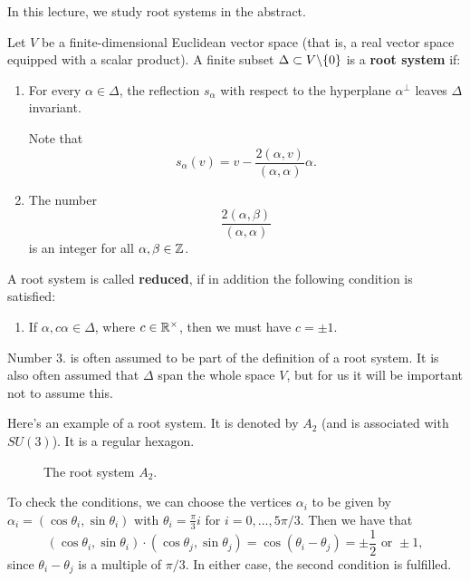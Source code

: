 \documentclass[11pt, english]{article}
\begin{document}
In this lecture, we study root systems in the abstract.

Let $V$ be a finite-dimensional Euclidean vector space (that is, a real vector space equipped with a scalar product). A finite subset $\Delta \subset V \backslash \{ 0 \}$ is a \textbf{root system} if:

\begin{enumerate}
\item For every $\alpha \in \Delta$, the reflection $s_\alpha$ with respect to the hyperplane $\alpha^\perp$ leaves $\Delta$ invariant.

Note that
$$
s_\alpha(v) = v - \frac{2(\alpha,v)}{(\alpha,\alpha)} \alpha.
$$
\item The number 
$$
\frac{2(\alpha, \beta)}{(\alpha,\alpha)}
$$
is an integer for all $\alpha, \beta \in \mathbb{Z}$.
    \setcounter{enumTemp}{\theenumi}
\end{enumerate}
A root system is called \textbf{reduced}, if in addition the following condition is satisfied:
\begin{enumerate}
\setcounter{enumi}{\theenumTemp}
\item If $\alpha, c\alpha \in \Delta$, where $ c \in \mathbb{R}^\times$, then we must have $c = \pm 1$.
\end{enumerate}

\begin{remark}
 Number 3. is often assumed to be part of the definition of a root system. It is also often assumed that $\Delta$ span the whole space $V$, but for us it will be important not to assume this.
\end{remark}

\begin{example}
  Here's an example of a root system. It is denoted by $A_2$ (and is associated with $SU(3)$). It is a regular hexagon.

\begin{figure}[h!]
\centering
{}
\caption{The root system $A_2$.}
\end{figure}

To check the conditions, we can choose the vertices $\alpha_i$ to be given by $\alpha_i=(\cos \theta_i, \sin \theta_i)$ with $\theta_i = \frac{\pi}{3} i$ for $i=0,\ldots,5 \pi/3$. Then we have that
$$
(\cos \theta_i, \sin \theta_i) \cdot (\cos \theta_j, \sin \theta_j)  = \cos(\theta_i - \theta_j) = \pm \frac 12 \text{ or } \pm 1,
$$
since $\theta_i-\theta_j$ is a multiple of $\pi/3$. In either case, the second condition is fulfilled. 
\end{example}
\end{document}
